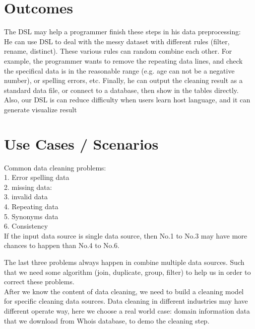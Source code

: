\documentclass[11pt]{article}
\begin{document}
\section{Outcomes}
\label{sec:outcomes}

The DSL may help a programmer finish these steps in his data preprocessing: \\
He can use DSL to deal with the messy dataset with different rules (filter, rename, distinct). These various rules can random combine each other. For example, the programmer wants to remove the repeating data lines, and check the specifical data is in the reasonable range (e.g. age can not be a negative number), or spelling errors, etc. Finally, he can output the cleaning result as a standard data file, or connect to a database, then show in the tables directly. \\
Also, our DSL is can reduce difficulty when users learn host language, and it can generate visualize result





\section{Use Cases / Scenarios}

\label{sec:examples}
  Common data cleaning problems:\\
    
 1. Error spelling data\\
 2. missing data:\\
 3. invalid data\\
 4. Repeating data\\
 5. Synonyms data\\
 6. Consistency\\

If the input data source is single data source, then No.1 to No.3 may have more chances to happen than No.4 to No.6.

The last three problems always happen in combine multiple data sources. Such that we need some algorithm (join, duplicate, group, filter) to help us in order to correct these problems.\\

After we know the content of data cleaning, we need to build a cleaning model for specific cleaning data sources. Data cleaning in different industries may have different operate way, here we choose a real world case: domain information data that we download from Whois database, to demo the cleaning step.\\
\end{document}
